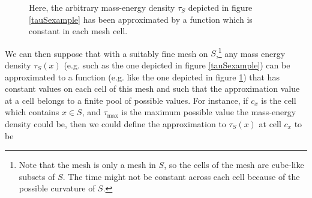 \documentclass[12pt]{report}
\providecommand{\DIFaddbeginFL}{} %
\providecommand{\DIFaddendFL}{} %
\providecommand{\DIFdelbeginFL}{} %
\providecommand{\DIFdelendFL}{} %
\begin{document}
  \begin{figure}[ht!]
    \captionsetup{justification=justified}
    \centering

    \vspace*{2px}
    \DIFdelbeginFL %
\DIFdelendFL \DIFaddbeginFL \caption[Approximated arbitrary mass-energy density]{\DIFaddendFL Here, the arbitrary mass-energy density $\tau_S$ depicted in figure \ref{tauSexample} has been approximated by a function which is constant in each mesh cell.}\label{tauSapprox}
    \end{figure}
    We can then suppose that with a suitably fine mesh\label{meshref} on $S$,\footnote{Note that the mesh is only a mesh in $S$, so the cells of the mesh are cube-like subsets of $S$. The time might not be constant across each cell because of the possible curvature of $S$.} any mass energy density $\tau_S(x)$ (e.g. such as the one depicted in figure \ref{tauSexample}) can be approximated to a function (e.g. like the one depicted in figure \ref{tauSapprox}) that has constant values on each cell of this mesh and such that the approximation value at a cell belongs to a finite pool of possible values. For instance, if $c_x$ is the cell which contains $x\in S$, and $\tau_{\text{max}}$ is the maximum possible value the mass-energy density could be, then we could define the approximation to $\tau_S(x)$ at cell $c_x$ to be
\end{document}
